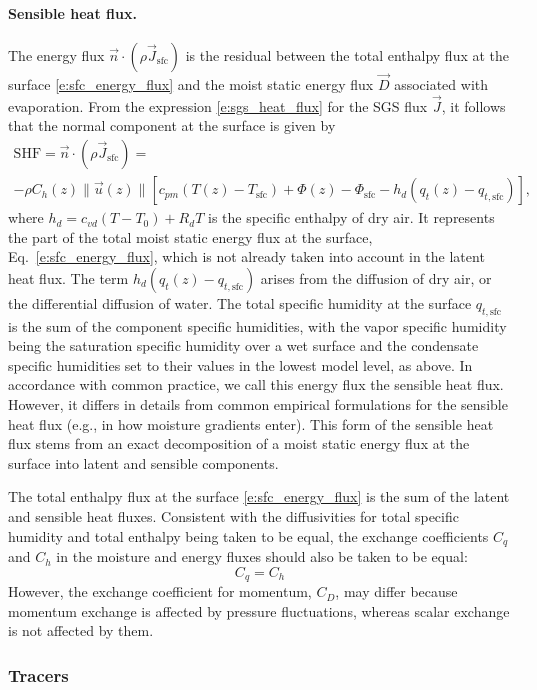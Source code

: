 \documentclass{article}
\begin{document}
\paragraph{Sensible heat flux.} The energy flux $\vec{n} \cdot (\rho \vec{J}_{\mathrm{sfc}})$ is the residual between the total enthalpy flux at the surface \eqref{e:sfc_energy_flux} and the moist static energy flux $\vec{D}$ associated with evaporation. From the expression \eqref{e:sgs_heat_flux} for the SGS flux $\vec{J}$, it follows that the normal component at the surface is given by 
\begin{multline}\label{e:sfc_SHF}
    \mathrm{SHF} = \vec{n} \cdot (\rho \vec{J}_{\mathrm{sfc}}) =
    \\ -\rho C_h(z) \| \vec{u}(z) \| \left[ c_{pm} (T(z) - T_\mathrm{sfc}) + \Phi(z) - \Phi_\mathrm{sfc}
    - h_d (q_t(z) - q_{t, \mathrm{sfc}})  \right],
\end{multline}
where $h_d = c_{vd} (T - T_0) + R_d T$ is the specific enthalpy of dry air. It represents the part of the total moist static energy flux at the surface, Eq.~\eqref{e:sfc_energy_flux}, which is not already taken into account in the latent heat flux. The term $h_d (q_t(z) - q_{t, \mathrm{sfc}})$ arises from the diffusion of dry air, or the differential diffusion of water. The total specific humidity at the surface $q_{t, \mathrm{sfc}}$ is the sum of the component specific humidities, with the vapor specific humidity being the saturation specific humidity over a wet surface and the condensate specific humidities set to their values in the lowest model level, as above. In accordance with common practice, we call this energy flux the sensible heat flux. However, it differs in details from common empirical formulations for the sensible heat flux (e.g., in how moisture gradients enter). This form of the sensible heat flux stems from an exact decomposition of a moist static energy flux at the surface into latent and sensible components. 

The total enthalpy flux at the surface \eqref{e:sfc_energy_flux} is the sum of the latent and sensible heat fluxes. Consistent with the diffusivities for total specific humidity and total enthalpy being taken to be equal, the exchange coefficients $C_q$ and $C_h$ in the moisture and energy fluxes should also be taken to be equal:
\[
C_q = C_h
\]
However, the exchange coefficient for momentum, $C_D$, may differ because momentum exchange is affected by pressure fluctuations, whereas scalar exchange is not affected by them.

\subsubsection{Tracers}
\end{document}
